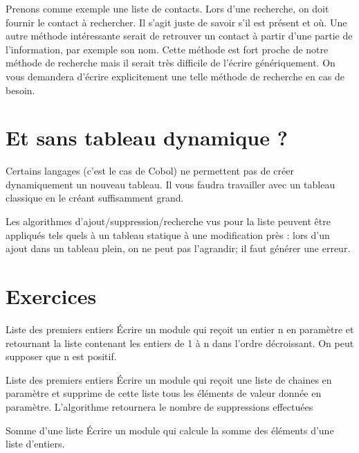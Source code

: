 Prenons comme exemple une liste de contacts.
Lors d'une recherche, on doit fournir
 le contact à
rechercher. Il s'agit juste de savoir
s'il est présent et où. Une autre méthode intéressante
serait de retrouver un contact à partir d'une partie
de l'information, par exemple son nom. Cette méthode
est fort proche de notre méthode de recherche mais il serait très
difficile de l'écrire génériquement. On vous demandera
d'écrire explicitement une telle méthode de recherche
en cas de besoin.


\section{Et sans tableau dynamique ?}

Certains langages (c’est le cas de Cobol) ne permettent pas de créer
dynamiquement un nouveau tableau. Il vous faudra travailler avec un
tableau classique en le créant suffisamment grand.


Les algorithmes d’ajout/suppression/recherche vus pour la liste peuvent
être appliqués tels quels à un tableau statique à une modification près
: lors d’un ajout dans un tableau plein, on ne peut pas l’agrandir; il
faut générer une erreur.


\section{Exercices}

\begin{Exercice}{Liste des premiers entiers}
	Écrire un module qui reçoit un entier n en paramètre et retournant la
	liste contenant les entiers de 1 à n dans l'ordre
	décroissant. On peut supposer que n est positif.
\end{Exercice}
	
\begin{Exercice}{	Liste des premiers entiers}
	Écrire un module qui reçoit une liste de chaines en paramètre et
	supprime de cette liste tous les éléments de valeur donnée en
	paramètre. L'algorithme retournera le nombre de
	suppressions effectuées
\end{Exercice}
	
\begin{Exercice}{Somme d'une liste}
	Écrire un module qui calcule la somme des éléments d’une liste
	d’entiers.
\end{Exercice}

